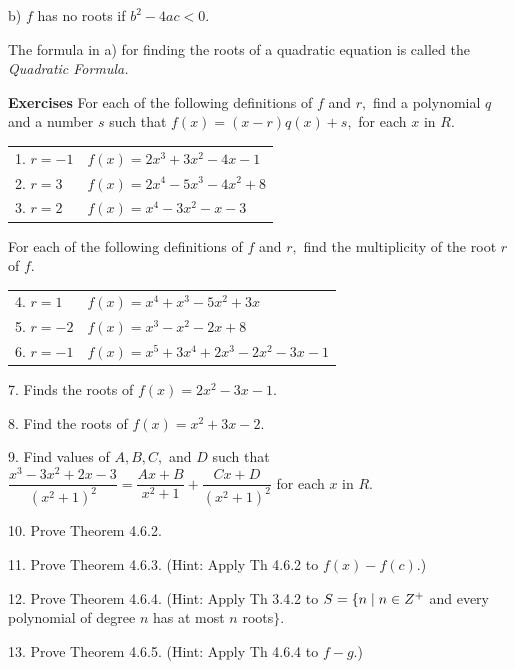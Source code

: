 b) $f$ has no roots if $b^{2} - 4ac < 0.$\nl

The formula in a) for finding the roots of a quadratic equation is called the \textit{Quadratic Formula.}\nl

\textbf{Exercises}\nl
For each of the following definitions of $f$ and $r,$ find a polynomial $q$ and a
number $s$ such that $f(x)=(x - r)q(x) + s,$ for each $x$ in $R.$\nl

\begin{tabular}{l l}
1. $r=-1$& $f(x)= 2x^{3} + 3x^{2} - 4x -1$ \\

2. $r=3$ &$f(x)= 2x^{4}- 5x^{3} - 4x^{2} + 8$ \\

3. $r=2$ &$f(x)= x^{4} - 3x^{2} -x - 3$ \\
\end{tabular}\nl


For each of the following definitions of $f$ and $r,$ find the multiplicity of the root $r$ of $f.$ \nl

\begin{tabular}{l l}

4. $r=1$ &$f(x)=x^{4}+ x^{3}- 5x^{2} + 3x$ \\

5. $r=-2$ &$f(x)=x^{3} -x^{2} - 2x + 8$ \\

6. $r=-1$& $f(x)=x^{5} + 3x^{4} + 2x^{3} - 2x^{2} -3x -1$ \\

\end{tabular}

7. Finds the roots of $f(x)= 2x^{2} - 3x - 1.$ \nl

\newpage

8. Find the roots of $f(x) = x^{2} + 3x - 2.$\nl

9. Find values of $A, B, C,$ and $D$ such that $\dfrac{x^{3} -3x^{2} + 2x - 3}{(x^{2} + 1)^{2}} = \dfrac{Ax + B}{x^{2} + 1} + \dfrac{Cx + D}{(x^{2} + 1)^{2}}$ for each $x$ in $R.$\nl

10. Prove Theorem 4.6.2. \nl­

11. Prove Theorem 4.6.3. (Hint: Apply Th 4.6.2 to $f(x)-f(c)$.) \nl

12. Prove Theorem 4.6.4. (Hint: Apply Th 3.4.2 to $S= \{n \mid n\in Z^{+} $ and every polynomial of degree $n$ has at most $n$ roots$\}.$\nl

13. Prove Theorem 4.6.5. (Hint: Apply Th 4.6.4 to $f - g$.) \nl

